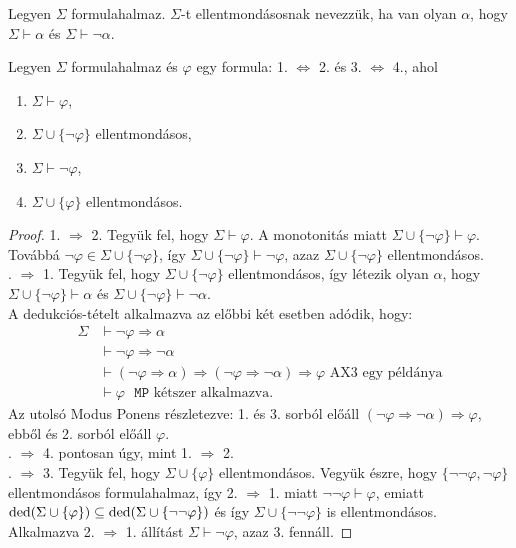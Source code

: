 \begin{defi}
Legyen $\Sigma$ formulahalmaz. $\Sigma$-t ellentmondásosnak nevezzük, ha van olyan $\alpha$, hogy $\Sigma \vdash \alpha$ és $\Sigma \vdash \lnot \alpha$.
\end{defi}
\begin{lem} Legyen $\Sigma$ formulahalmaz és $\varphi$ egy formula: 1. $\Leftrightarrow$ 2. és 3. $\Leftrightarrow$ 4., ahol
\begin{enumerate}
\item $\Sigma \vdash \varphi$,
\item $\Sigma \cup \lbrace \lnot \varphi \rbrace$ ellentmondásos,
\item $\Sigma \vdash \lnot \varphi$,
\item $\Sigma \cup \lbrace \varphi \rbrace$ ellentmondásos.
\end{enumerate}
\end{lem}
\begin{proof}
1. $\Rightarrow$ 2. Tegyük fel, hogy $\Sigma \vdash \varphi$. A monotonitás miatt $\Sigma \cup \lbrace \lnot \varphi \rbrace \vdash \varphi$. Továbbá $\lnot \varphi \in \Sigma \cup \lbrace \lnot \varphi \rbrace$, így $\Sigma \cup \lbrace \lnot \varphi \rbrace \vdash \lnot \varphi$, azaz $\Sigma \cup \lbrace \lnot \varphi \rbrace$ ellentmondásos. \\
. $\Rightarrow$ 1. Tegyük fel, hogy $\Sigma \cup \lbrace \lnot \varphi \rbrace$ ellentmondásos, így létezik olyan $\alpha$, hogy $\Sigma \cup \lbrace \lnot \varphi \rbrace \vdash \alpha$ és $\Sigma \cup \lbrace \lnot \varphi \rbrace \vdash \lnot \alpha$. \\
\indent A dedukciós-tételt alkalmazva az előbbi két esetben adódik, hogy: 
\begin{equation*}
\begin{split}
\Sigma &\vdash \lnot \varphi \Rightarrow \alpha \\
&\vdash \lnot \varphi \Rightarrow \lnot \alpha \\
& \vdash (\lnot \varphi \Rightarrow \alpha) \Rightarrow (\lnot \varphi \Rightarrow \lnot \alpha) \Rightarrow \varphi \text{ AX3 egy példánya} \\
& \vdash \varphi \text{ $\texttt{MP}$ kétszer alkalmazva.}
\end{split}
\end{equation*}
Az utolsó Modus Ponens részletezve: 1. és 3. sorból előáll $(\lnot \varphi \Rightarrow \lnot \alpha) \Rightarrow \varphi$, ebből és 2. sorból előáll $\varphi$. \\
. $\Rightarrow$ 4. pontosan úgy, mint 1. $\Rightarrow$ 2. \\
. $\Rightarrow$ 3. Tegyük fel, hogy $\Sigma \cup \lbrace \varphi \rbrace$ ellentmondásos. Vegyük észre, hogy $\lbrace \lnot \lnot \varphi, \lnot \varphi \rbrace$ ellentmondásos formulahalmaz, így 2. $\Rightarrow$ 1. miatt $\lnot \lnot \varphi \vdash \varphi$, emiatt $\mathop{\mathrm{ded}}(\Sigma \cup \lbrace \varphi \rbrace) \subseteq \mathop{\mathrm{ded}}(\Sigma \cup \lbrace \lnot \lnot \varphi \rbrace)$ és így $\Sigma \cup \lbrace \lnot \lnot \varphi \rbrace$ is ellentmondásos. Alkalmazva 2. $\Rightarrow$ 1. állítást $\Sigma \vdash \lnot \varphi$, azaz 3. fennáll.
\end{proof}

